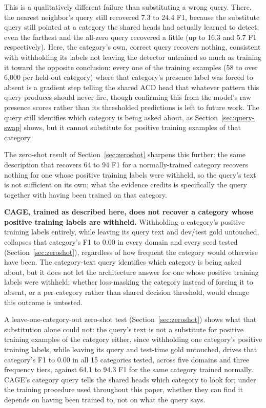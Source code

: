 This is a qualitatively different failure than substituting a wrong query.
There, the nearest neighbor's query still recovered 7.3 to 24.4 F1, because
the substitute query still pointed at a category the shared heads had
actually learned to detect; even the farthest and the all-zero query
recovered a little (up to 16.3 and 5.7 F1 respectively). Here, the
category's own, correct query recovers nothing, consistent with withholding
its labels not leaving the detector untrained so much as training it toward
the opposite conclusion: every one of the training examples (58 to over 6,000 per held-out
category) where that category's presence label was forced to absent is a gradient
step telling the shared ACD head that whatever pattern this query produces
should never fire, though confirming this from the model's raw presence
scores rather than its thresholded predictions is left to future work. The
query still identifies which category is being asked about, as
Section~\ref{sec:query-swap} shows, but it cannot substitute for positive
training examples of that category.


The zero-shot result of
Section~\ref{sec:zeroshot} sharpens this further: the same description that
recovers 64 to 94 F1 for a normally-trained category recovers nothing for
one whose positive training labels were withheld, so the query's text is not
sufficient on its own; what the evidence credits is specifically the query
together with having been trained on that category.

\textbf{CAGE, trained as described here, does not recover a category whose positive
training labels are withheld.} Withholding a category's positive training labels entirely,
while leaving its query text and dev/test gold untouched, collapses that
category's F1 to 0.00 in every domain and every seed tested
(Section~\ref{sec:zeroshot}), regardless of how frequent the category would
otherwise have been. The category-text query identifies which category is
being asked about, but it does not let the architecture answer for one whose
positive training labels were withheld; whether loss-masking the category instead of
forcing it to absent, or a per-category rather than shared decision
threshold, would change this outcome is untested.

A leave-one-category-out zero-shot test
(Section~\ref{sec:zeroshot}) shows what that substitution alone could not: the
query's text is not a substitute for positive training examples of the category either,
since withholding one category's positive training labels, while leaving its
query and test-time gold untouched, drives that category's F1 to 0.00 in all 15
categories tested, across five domains and three frequency tiers, against
64.1 to 94.3 F1 for the same category trained normally. CAGE's category
query tells the shared heads which category to look for; under the training
procedure used throughout this paper, whether they can find it depends on
having been trained to, not on what the query says.

